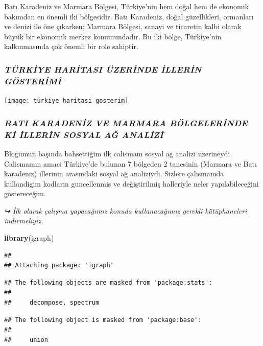 \documentclass[
]{article}
\newenvironment{Shaded}{\begin{snugshade}}{\end{snugshade}}
\newcommand{\FunctionTok}[1]{\textcolor[rgb]{0.13,0.29,0.53}{\textbf{#1}}}
\newcommand{\NormalTok}[1]{#1}
\begin{document}
Batı Karadeniz ve Marmara Bölgesi, Türkiye'nin hem doğal hem de ekonomik
bakımdan en önemli iki bölgesidir. Batı Karadeniz, doğal güzellikleri,
ormanları ve denizi ile öne çıkarken; Marmara Bölgesi, sanayi ve
ticaretin kalbi olarak büyük bir ekonomik merkez konumundadır. Bu iki
bölge, Türkiye'nin kalkınmasında çok önemli bir role sahiptir.

\subsubsection{\texorpdfstring{\textbf{\emph{TÜRKİYE HARİTASI ÜZERİNDE
İLLERİN
GÖSTERİMİ}}}{TÜRKİYE HARİTASI ÜZERİNDE İLLERİN GÖSTERİMİ}}\label{tuxfcrkiye-haritasi-uxfczerinde-illerin-guxf6sterimi}

\texttt{[image: türkiye\_haritasi\_gosterim]}

\subsubsection{\texorpdfstring{\textbf{\emph{BATI KARADENİZ VE MARMARA
BÖLGELERİNDE Kİ İLLERİN SOSYAL AĞ ANALİZİ
}}}{BATI KARADENİZ VE MARMARA BÖLGELERİNDE Kİ İLLERİN SOSYAL AĞ ANALİZİ }}\label{bati-karadeniz-ve-marmara-buxf6lgelerinde-ki-illerin-sosyal-aux11f-analizi}

Blogumun başında bahsettiğim ilk calismam sosyal ag analizi uzerineydi.
Calismamın amaci Türkiye'de bulunan 7 bölgeden 2 tanesinin (Marmara ve
Batı karadeniz) illerinin arasındaki sosyal ağ analiziydi. Sizlere
çalismamda kullandigim kodların guncellenmis ve değiştirilmiş halleriyle
neler yapılabileceğini göstereceğim.

\emph{↪ İlk olarak çalışma yapacağımız konuda kullanacağımız gerekli
kütüphaneleri indirmeliyiz.}

\begin{Shaded}
\begin{Highlighting}[]
\FunctionTok{library}\NormalTok{(igraph)}
\end{Highlighting}
\end{Shaded}

\begin{verbatim}
## 
## Attaching package: 'igraph'
\end{verbatim}

\begin{verbatim}
## The following objects are masked from 'package:stats':
## 
##     decompose, spectrum
\end{verbatim}

\begin{verbatim}
## The following object is masked from 'package:base':
## 
##     union
\end{verbatim}
\end{document}
